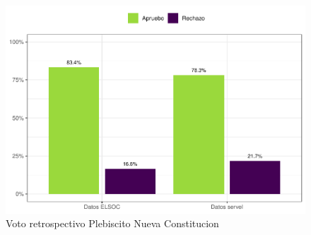 \documentclass[
  12pt,
]{book}
\begin{document}
\begin{figure}

{\centering \includegraphics{reporte-elsoc_files/figure-latex/servel-apruebo-1} 

}

\caption{Voto retrospectivo Plebiscito Nueva Constitucion}\label{fig:servel-apruebo}
\end{figure}
\end{document}
